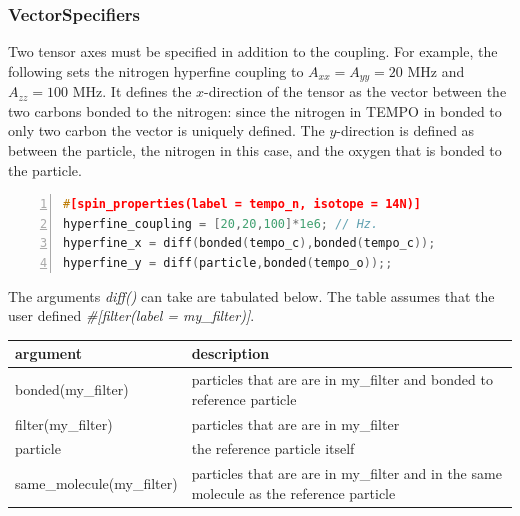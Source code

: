\documentclass{book}
\begin{document}
\subsubsection{VectorSpecifiers} %
Two tensor axes must be specified in addition to the coupling. 
For example, the following sets the nitrogen hyperfine coupling to 
$A_{xx} = A_{yy} = 20$ MHz and $A_{zz} = 100$ MHz.  
It defines the $x$-direction of the tensor as the vector between the two
carbons bonded to the nitrogen: since the nitrogen in TEMPO in bonded to only
two carbon the vector is uniquely defined.  The $y$-direction is defined as
between the particle, the nitrogen in this case, and the oxygen that is bonded 
to the particle.
\begin{lstlisting}[frame=single,numbers=left,language=c]
#[spin_properties(label = tempo_n, isotope = 14N)]
hyperfine_coupling = [20,20,100]*1e6; // Hz.
hyperfine_x = diff(bonded(tempo_c),bonded(tempo_c));
hyperfine_y = diff(particle,bonded(tempo_o));;
\end{lstlisting}

The arguments \textit{diff()} can take are tabulated below.
The table assumes that the user defined 
\textit{\#[filter(label = my\_filter)]}.
\begin{center}
\begin{tabular}{| m{20em} |  m{7cm} |}
 \hline 
 \textbf{argument} & \textbf{description} \\ 
 \hline 
 bonded(my\_filter) & 
 particles that are are in my\_filter and bonded to reference particle\\ 
 \hline 
 filter(my\_filter) & 
 particles that are are in my\_filter\\ 
 \hline 
 particle & 
 the reference particle itself\\ 
 \hline 
 same\_molecule(my\_filter) & 
 particles that are are in my\_filter and in the same molecule as 
 the reference particle\\ 
 \hline 
\end{tabular}
\end{center} 
\end{document}
